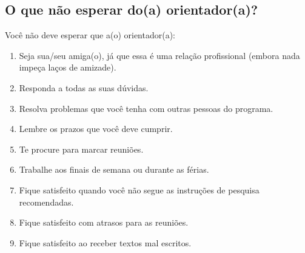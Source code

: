 \documentclass[twoside a4paper 12pt]{report}
\begin{document}
\subsection{O que não esperar do(a) orientador(a)?}
Você não deve esperar que a(o) orientador(a):
\begin{enumerate}
\item Seja sua/seu amiga(o), já que essa é uma relação profissional (embora nada impeça laços de amizade).
\item Responda a todas as suas dúvidas.
\item Resolva problemas que você tenha com outras pessoas do programa.
\item Lembre os prazos que você deve cumprir.
\item Te procure para marcar reuniões.
\item Trabalhe aos finais de semana ou durante as férias.
\item Fique satisfeito quando você não segue as instruções de pesquisa recomendadas.
\item Fique satisfeito com atrasos para as reuniões.
\item Fique satisfeito ao receber textos mal escritos.
\end{enumerate}
\end{document}
